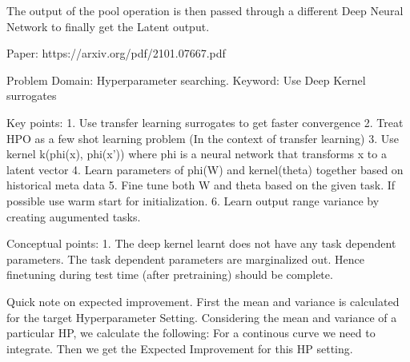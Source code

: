 \documentclass[12pt, twoside, ngerman]{report}
\begin{document}
The output of the pool operation is then passed through a different Deep Neural Network to finally get the Latent output.

\iffalse
Paper: https://arxiv.org/pdf/2101.07667.pdf

Problem Domain: Hyperparameter searching.
Keyword: Use Deep Kernel surrogates

Key points:
    1. Use transfer learning surrogates to get faster convergence
    2. Treat HPO as a few shot learning problem (In the context of transfer learning)
    3. Use kernel k(phi(x), phi(x')) where phi is a neural network that transforms x to a latent vector
    4. Learn parameters of phi(W) and kernel(theta) together based on historical meta data
    5. Fine tune both W and theta based on the given task. If possible use warm start for initialization.
    6. Learn output range variance by creating augumented tasks.

Conceptual points:
    1. The deep kernel learnt does not have any task dependent parameters.
       The task dependent parameters are marginalized out.
       Hence finetuning during test time (after pretraining) should be complete.

Quick note on expected improvement.
    First the mean and variance is calculated for the target Hyperparameter Setting.
    Considering the mean and variance of a particular HP, we calculate the following:
        For a continous curve we need to integrate.
    Then we get the Expected Improvement for this HP setting.
\end{document}

